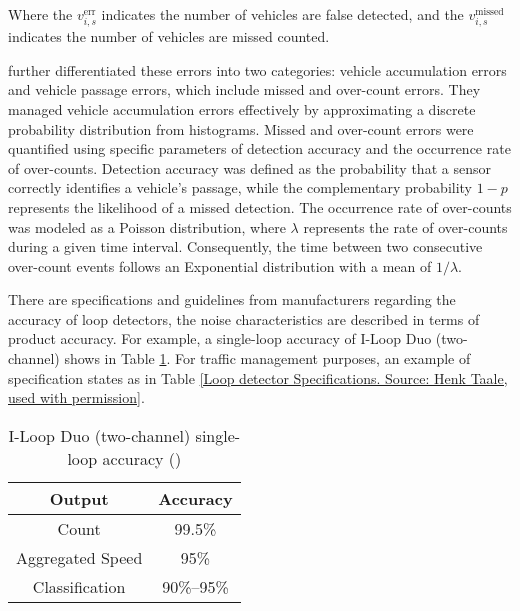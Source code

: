  Where the $v_{i,s}^{\text{err}}$ indicates the number of vehicles are false detected, and the $v_{i,s}^{\text{missed}}$ indicates the number of vehicles are missed counted.

 
\textcite{xie2018generic} further differentiated these errors into two categories: vehicle accumulation errors and vehicle passage errors, which include missed and over-count errors. They managed vehicle accumulation errors effectively by approximating a discrete probability distribution from histograms. Missed and over-count errors were quantified using specific parameters of detection accuracy and the occurrence rate of over-counts. Detection accuracy was defined as the probability that a sensor correctly identifies a vehicle's passage, while the complementary probability $1 - p$ represents the likelihood of a missed detection. The occurrence rate of over-counts was modeled as a Poisson distribution, where $\lambda$ represents the rate of over-counts during a given time interval. Consequently, the time between two consecutive over-count events follows an Exponential distribution with a mean of $1 / \lambda$.

There are specifications and guidelines from manufacturers regarding the accuracy of loop detectors, the noise characteristics are described in terms of product accuracy. For example, a single-loop accuracy of I-Loop Duo (two-channel) shows in Table \ref{I-Loop Duo (two-channel) single-loop accuracy}. For traffic management purposes, an example of specification states as in Table \ref{Loop detector Specifications. Source: Henk Taale, used with permission}.

\begin{table}[htp]
    \centering
    \begin{tabular}{cc}
    \hline
        Output & Accuracy\\ \hline
        Count & 99.5\%\\
        Aggregated Speed & 95\% \\
        Classification & 90\%–95\% \\ \hline
    \end{tabular}
    \caption{I-Loop Duo (two-channel) single-loop accuracy (\textcite{klein2024roadside})}
    \label{I-Loop Duo (two-channel) single-loop accuracy}
\end{table}



